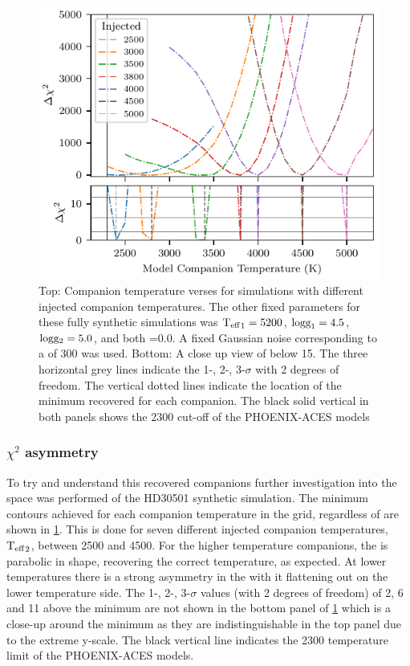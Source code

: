 \begin{figure}
    \centering
    \includegraphics[width=0.7\linewidth]{figures/companion_recovery/chi2_shape_investigation_with_delta}
    \caption[Shape of simulated \textchisquared{} with different injected companion temperatures.]{Top: Companion temperature verses \textchisquared{} for simulations with different injected companion temperatures.
        The other fixed parameters for these fully synthetic simulations was \({\textrm{T}_{\mathrm{eff}}}_{1}=5200\)\K{}, \(\textrm{logg}_{1}=4.5\), \(\textrm{logg}{}_{2}=5.0\), and both \feh{}=0.0.
        A fixed Gaussian noise corresponding to a \snr{} of 300 was used.
        Bottom: A close up view of \textchisquared{} below 15.
        The three horizontal grey lines indicate the 1-, 2-, 3-$\sigma$ with 2 degrees of freedom.
        The vertical dotted lines indicate the location of the minimum \textchisquared{} recovered for each companion.
        The black solid vertical in both panels shows the 2300\K{} cut-off of the {PHOENIX-ACES} models}
    \label{fig:injection_shape}
\end{figure}

\todo{}
\subsubsection{\(\chi^2\) asymmetry} 
\label{subsubsec:chi2_assymetry}

To try and understand this recovered companions further investigation into the \textchisquared{} space was performed of the {HD30501} synthetic simulation.
The minimum \textchisquared{} contours achieved for each companion temperature in the grid, regardless of \Rvtwo{} are shown in \cref{fig:injection_shape}.
This is done for seven different injected companion temperatures, \({\textrm{T}_{\mathrm{eff}}}_{2}\), between 2500 and 4500\K{}.
For the higher temperature companions, the \textchisquared{} is parabolic in shape, recovering the correct temperature, as expected.
At lower temperatures there is a strong asymmetry in the \textchisquared{} with it flattening out on the lower temperature side.
The 1-, 2-, 3-\(\sigma\) values (with 2 degrees of freedom) of 2, 6 and 11 above the minimum \textchisquared{} are not shown in the bottom panel of \cref{fig:injection_shape} which is a close-up around the minimum \textchisquared{} as they are indistinguishable in the top panel due to the extreme \textchisquared{} y-scale.
The black vertical line indicates the 2300\K{} temperature limit of the {PHOENIX-ACES} models.

